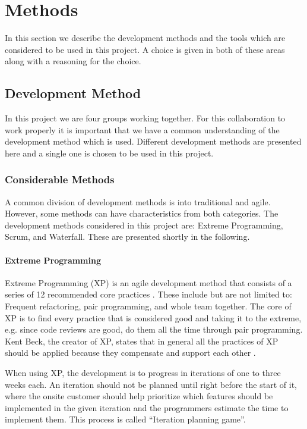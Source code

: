 \section{Methods}
In this section we describe the development methods and the tools which are considered to be used in this project.
A choice is given in both of these areas along with a reasoning for the choice.

\subsection{Development Method}
In this project we are four groups working together.
For this collaboration to work properly it is important that we have a common understanding of the development method which is used.
Different development methods are presented here and a single one is chosen to be used in this project.

\subsubsection{Considerable Methods}
A common division of development methods is into traditional and agile\cite{???}.
However, some methods can have characteristics from both categories.
The development methods considered in this project are: Extreme Programming, Scrum, and Waterfall.
These are presented shortly in the following.

\paragraph{Extreme Programming}
Extreme Programming (XP) is an agile development method that consists of a series of 12 recommended core practices \cite[p.~137]{Larman04}.
These include but are not limited to: Frequent refactoring, pair programming, and  whole team together.
The core of XP is to find every practice that is considered good and taking it to the extreme, e.g. since code reviews are good, do them all the time through pair programming.
Kent Beck, the creator of XP, states that in general all the practices of XP should be applied because they compensate and support each other \cite[p.~156-157]{Larman04}.

When using XP, the development is to progress in iterations of one to three weeks each.
An iteration should not be planned until right before the start of it, where the onsite customer should help prioritize which features should be implemented in the given iteration and the programmers estimate the time to implement them.
This process is called ``Iteration planning game''.

